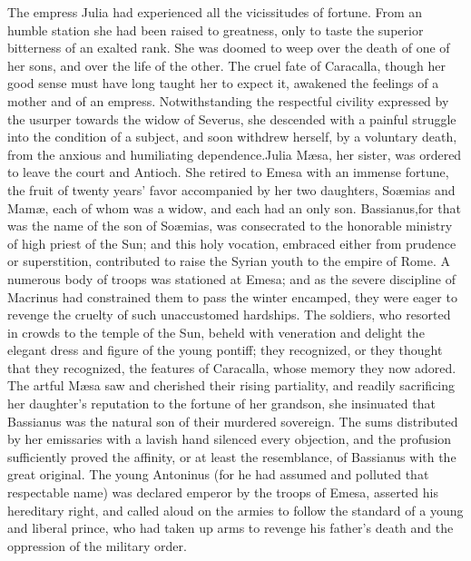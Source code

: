 
The empress Julia had experienced all the vicissitudes of
fortune. From an humble station she had been raised to greatness,
only to taste the superior bitterness of an exalted rank. She was
doomed to weep over the death of one of her sons, and over the
life of the other. The cruel fate of Caracalla, though her good
sense must have long taught her to expect it, awakened the
feelings of a mother and of an empress. Notwithstanding the
respectful civility expressed by the usurper towards the widow of
Severus, she descended with a painful struggle into the condition
of a subject, and soon withdrew herself, by a voluntary death,
from the anxious and humiliating dependence.\footnotemark[46] \footnotemark[461] Julia Mæsa,
her sister, was ordered to leave the court and Antioch. She
retired to Emesa with an immense fortune, the fruit of twenty
years’ favor accompanied by her two daughters, Soæmias and Mamæ,
each of whom was a widow, and each had an only son. Bassianus,\footnotemark[462]
for that was the name of the son of Soæmias, was consecrated
to the honorable ministry of high priest of the Sun; and this
holy vocation, embraced either from prudence or superstition,
contributed to raise the Syrian youth to the empire of Rome. A
numerous body of troops was stationed at Emesa; and as the severe
discipline of Macrinus had constrained them to pass the winter
encamped, they were eager to revenge the cruelty of such
unaccustomed hardships. The soldiers, who resorted in crowds to
the temple of the Sun, beheld with veneration and delight the
elegant dress and figure of the young pontiff; they recognized,
or they thought that they recognized, the features of Caracalla,
whose memory they now adored. The artful Mæsa saw and cherished
their rising partiality, and readily sacrificing her daughter’s
reputation to the fortune of her grandson, she insinuated that
Bassianus was the natural son of their murdered sovereign. The
sums distributed by her emissaries with a lavish hand silenced
every objection, and the profusion sufficiently proved the
affinity, or at least the resemblance, of Bassianus with the
great original. The young Antoninus (for he had assumed and
polluted that respectable name) was declared emperor by the
troops of Emesa, asserted his hereditary right, and called aloud
on the armies to follow the standard of a young and liberal
prince, who had taken up arms to revenge his father’s death and
the oppression of the military order.\footnotemark[47]

